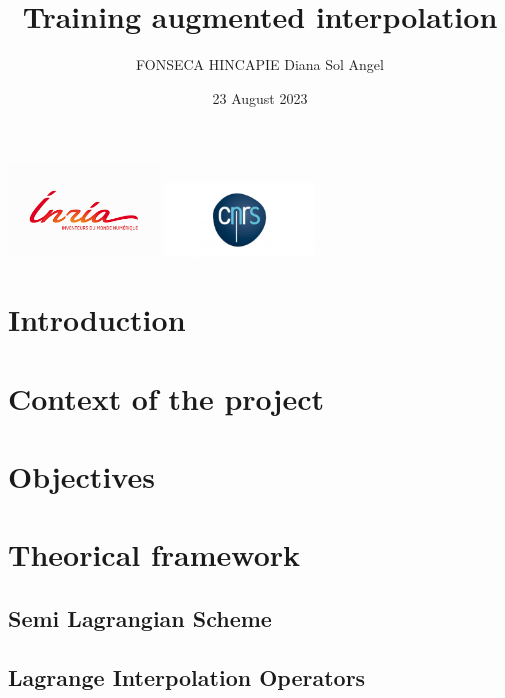 \documentclass{beamer}
\begin{document}
\title[]{Training augmented interpolation}

\author[FONSECA HINCAPIE Diana Sol Angel]{FONSECA HINCAPIE Diana Sol Angel}
\date[23 August 2023]{23 August 2023}

\begin{frame}
\titlepage
\begin{center}
\includegraphics[width=0.3\textwidth]{images/inria.png}
\includegraphics[width=0.3\textwidth]{images/cnrslogo.jpeg}

\end{center}
\end{frame}

\section{Introduction}


\section{Context of the project}


\section{Objectives}


\section{Theorical framework}
\subsection{Semi Lagrangian Scheme}
% 

\subsection{Lagrange Interpolation Operators}

\end{document}
